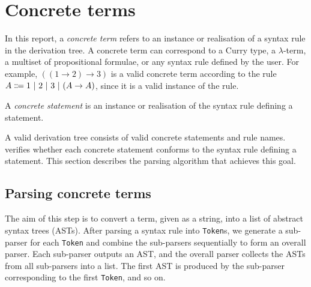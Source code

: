 \section{Concrete terms}
\label{section:term}
In this report, a \textit{concrete term} refers to an instance or realisation of a syntax rule in the derivation tree. A concrete term can correspond to a Curry type, a $\lambda$-term, a multiset of propositional formulae, or any syntax rule defined by the user. For example, $((1 \to 2) \to 3)$ is a valid concrete term according to the rule $A \Coloneqq 1 \ |\  2 \ |\  3 \ |\  (A \to A)$, since it is a valid instance of the rule.

A \textit{concrete statement} is an instance or realisation of the syntax rule defining a statement.

A valid derivation tree consists of valid concrete statements and rule names. \projectname{} verifies whether each concrete statement conforms to the syntax rule defining a statement. This section describes the parsing algorithm that achieves this goal.

\subsection{Parsing concrete terms}
The aim of this step is to convert a term, given as a string, into a list of abstract syntax trees (ASTs). After parsing a syntax rule into \lstinline{Token}s, we generate a sub-parser for each \lstinline{Token} and combine the sub-parsers sequentially to form an overall parser. Each sub-parser outputs an AST, and the overall parser collects the ASTs from all sub-parsers into a list. The first AST is produced by the sub-parser corresponding to the first \lstinline{Token}, and so on.

